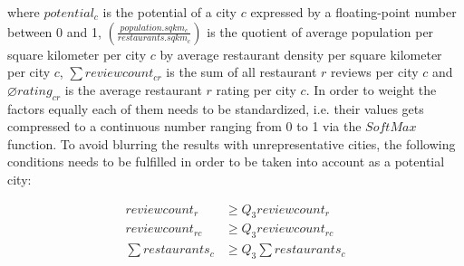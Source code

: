 where $potential_c$ is the potential of a city $c$ expressed by a floating-point number between 0 and 1,  $(\frac{population.sqkm_c}{restaurants.sqkm_c})$ is the quotient of average population per square kilometer per city $c$ by average restaurant density per square kilometer per city $c$, $\sum reviewcount_{cr}$ is the sum of all restaurant $r$ reviews per city $c$ and $\varnothing rating_{cr}$ is the average restaurant $r$ rating per city $c$. In order to weight the factors equally each of them needs to be standardized, i.e. their values  gets compressed to a continuous number ranging from 0 to 1 via the $SoftMax$ function.\newline
To avoid blurring the results with unrepresentative cities, the following conditions needs to be fulfilled in order to be taken into account as a potential city:

\begin{equation}
\begin{aligned}
reviewcount_{r} &\geq Q_3 reviewcount_{r} \\
reviewcount_{rc} &\geq Q_3 reviewcount_{rc} \\
\sum restaurants_{c} &\geq Q_3 \sum restaurants_{c}
\end{aligned}
\label{eq:potential_condition}
\end{equation}

